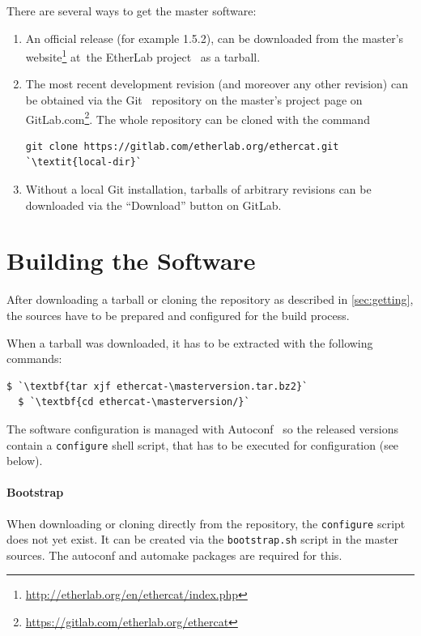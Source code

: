 \documentclass[a4paper,12pt,BCOR6mm,bibtotoc,idxtotoc]{scrbook}
\newcommand{\masterversion}{1.5.2}
\begin{document}
There are several ways to get the master software:

\begin{enumerate}

\item An official release (for example \masterversion), can be downloaded from
the master's website\footnote{\url{http://etherlab.org/en/ethercat/index.php}}
at~the EtherLab project~\cite{etherlab} as a tarball.

\item The most recent development revision (and moreover any other revision)
can be obtained via the Git~\cite{git} repository on the master's
project page on
GitLab.com\footnote{\url{https://gitlab.com/etherlab.org/ethercat}}.
The whole repository can be cloned with the command

\begin{lstlisting}[breaklines=true]
git clone https://gitlab.com/etherlab.org/ethercat.git `\textit{local-dir}`
\end{lstlisting}

\item Without a local Git installation, tarballs of arbitrary revisions
can be downloaded via the ``Download'' button on GitLab.

\end{enumerate}

\section{Building the Software}

After downloading a tarball or cloning the repository as described in
\autoref{sec:getting}, the sources have to be prepared and configured for the
build process.

When a tarball was downloaded, it has to be extracted with the following
commands:

\begin{lstlisting}[gobble=2]
  $ `\textbf{tar xjf ethercat-\masterversion.tar.bz2}`
  $ `\textbf{cd ethercat-\masterversion/}`
\end{lstlisting}

The software configuration is managed with Autoconf~\cite{autoconf} so the
released versions contain a \lstinline+configure+ shell script, that has to be
executed for configuration (see below).

\paragraph{Bootstrap} When downloading or cloning directly from the
repository, the \lstinline+configure+ script does not yet exist. It can be
created via the \lstinline+bootstrap.sh+ script in the master sources. The
autoconf and automake packages are required for this.
\end{document}
